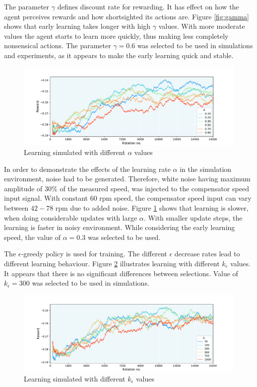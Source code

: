 The parameter $\gamma$ defines discount rate for rewarding. It has effect on how the agent perceives rewards and how shortsighted its actions are. Figure \ref{fig:gamma} shows that early learning takes longer with high $\gamma$ values. With more moderate values the agent starts to learn more quickly, thus making less completely nonsensical actions. The parameter $\gamma = 0.6$ was selected to be used in simulations and experiments, as it appears to make the early learning quick and stable.
\begin{figure}[htb] 
    \centering
    \includegraphics[width=\textwidth]{images/Qalpha_wide.pdf}
    \caption{\small Learning simulated with different $\alpha$ values}
    \label{fig:alpha}
\end{figure}

In order to demonstrate the effects of the learning rate $\alpha$ in the simulation environment, noise had to be generated. Therefore, white noise having maximum amplitude of 30\% of the measured speed, was injected to the compensator speed input signal. With constant $60$ rpm speed, the compensator speed input can vary between $42-78$ rpm due to added noise. Figure \ref{fig:alpha} shows that learning is slower, when doing considerable updates with large $\alpha$. With smaller update steps, the learning is faster in noisy environment. While considering the early learning speed, the value of $\alpha = 0.3$ was selected to be used.

The $\epsilon$-greedy policy is used for training. The different $\epsilon$ decrease rates lead to different learning behaviour. Figure \ref{fig:glie} illustrates learning with different $k_\epsilon$ values. It appears that there is no significant differences between selections. Value of $k_\epsilon = 300$ was selected to be used in simulations.
\begin{figure}[htb] 
    \centering
    \includegraphics[width=\textwidth]{images/Qk_wide.pdf}
    \caption{\small Learning simulated with different $k_{\epsilon}$ values}
    \label{fig:glie}
\end{figure}

